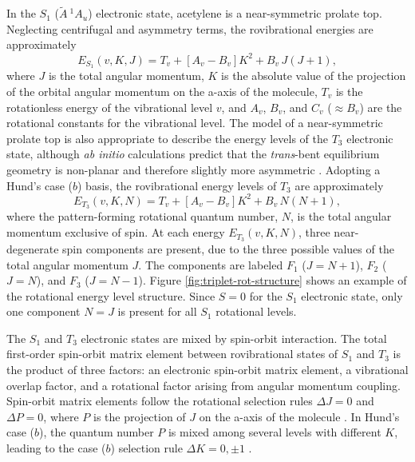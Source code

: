 \documentclass[12pt]{mitthesis}
\newcommand{\astate}{$
  \tilde{A} \: ^1\!A_u
  $}
\begin{document}
In the $S_1$ (\astate) electronic state, acetylene is a near-symmetric
prolate top.  Neglecting centrifugal and asymmetry terms, the
rovibrational energies are approximately \cite{watson82}
\begin{equation}
  \label{eq:s1-energy-levels}
  E_{S_1}(v,K,J) = T_v + [A_v - B_v] K^2 + B_v \, J(J+1),
\end{equation}
where $J$ is the total angular momentum, $K$ is the absolute value of
the projection of the orbital angular momentum on the a-axis of the
molecule, $T_v$ is the rotationless energy of the vibrational level
$v$, and $A_v$, $B_v$, and $C_v$ ($\approx B_v$) are the rotational
constants for the vibrational level.  The model of a near-symmetric
prolate top is also appropriate to describe the energy levels of the
$T_3$ electronic state, although \emph{ab initio} calculations predict
that the \emph{trans}-bent equilibrium geometry is non-planar and
therefore slightly more asymmetric \cite{ventura03, thom07}.  Adopting
a Hund's case ($b$) basis, the rovibrational energy levels of $T_3$
are approximately
\begin{equation}
  \label{eq:t3-energy-levels}
  E_{T_3}(v,K,N) = T_v + [A_v - B_v] K^2 + B_v \, N(N+1),
\end{equation}
where the pattern-forming rotational quantum number, $N$, is the total
angular momentum exclusive of spin.  At each energy $E_{T_3}(v,K,N)$,
three near-degenerate spin components are present, due to the three
possible values of the total angular momentum $J$.  The components are
labeled $F_1$ ($J=N+1$), $F_2$ ($J=N$), and $F_3$ ($J=N-1$).  Figure
\ref{fig:triplet-rot-structure} shows an example of the rotational
energy level structure.  Since $S=0$ for the $S_1$ electronic state,
only one component $N=J$ is present for all $S_1$ rotational levels.

The $S_1$ and $T_3$ electronic states are mixed by spin-orbit
interaction.  The total first-order spin-orbit matrix element between
rovibrational states of $S_1$ and $T_3$ is the product of three
factors: an electronic spin-orbit matrix element, a vibrational
overlap factor, and a rotational factor arising from angular momentum
coupling.  Spin-orbit matrix elements follow the rotational selection
rules $\Delta J = 0$ and $\Delta P = 0$, where $P$ is the projection
of $J$ on the a-axis of the molecule \cite{hougen64}.  In Hund's case
($b$), the quantum number $P$ is mixed among several levels with
different $K$, leading to the case ($b$) selection rule $\Delta K = 0,
\pm 1$ \cite{hougen64, stevens73}.
\end{document}

